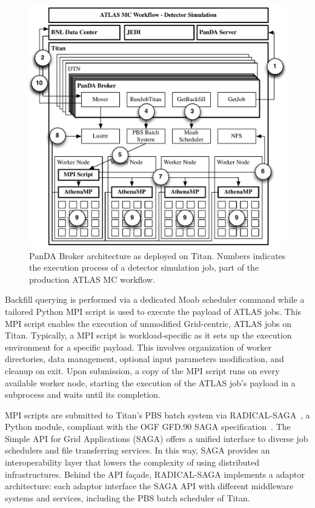 \begin{figure}
    \centering
    \includegraphics[width=\columnwidth]{figures/panda_broker_architecture.pdf}
    \caption{PanDA Broker architecture as deployed on Titan. Numbers indicates
    the execution process of a detector simulation job, part of the production
    ATLAS MC workflow.}
\label{fig:panda_broker}
\end{figure}

Backfill querying is performed via a dedicated Moab scheduler command while a
tailored Python MPI script is used to execute the payload of ATLAS jobs. This
MPI script enables the execution of unmodified Grid-centric, ATLAS jobs on
Titan. Typically, a MPI script is workload-specific as it sets up the execution
environment for a specific payload. This involves organization of worker
directories, data management, optional input parameters modification, and
cleanup on exit. Upon submission, a copy of the MPI script runs on every
available worker node, starting the execution of the ATLAS job's payload in a
subprocess and waits until its completion.

MPI scripts are submitted to Titan's PBS batch system via
RADICAL-SAGA~\cite{radical-saga_url}, a Python module, compliant with the OGF
GFD.90 SAGA specification~\cite{goodale2008simple}. The Simple API for Grid
Applications (SAGA) offers a unified interface to diverse job schedulers and
file transferring services. In this way, SAGA provides an interoperability layer
that lowers the complexity of using distributed infrastructures. Behind the API
façade, RADICAL-SAGA implements a adaptor architecture: each adaptor interface
the SAGA API with different middleware systems and services, including the PBS
batch scheduler of Titan.

